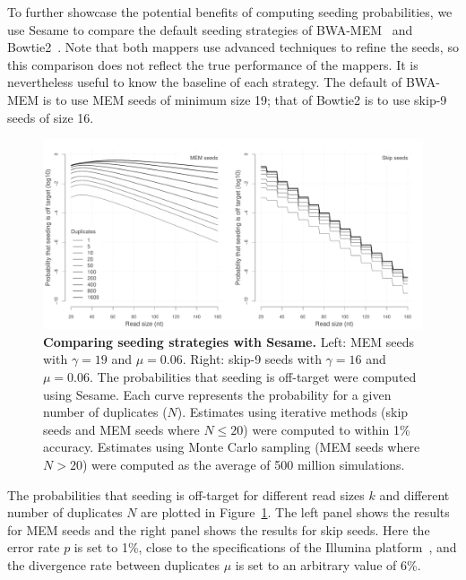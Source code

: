 \documentclass{article}
\begin{document}
To further showcase the potential benefits of computing seeding
probabilities, we use Sesame to compare the default seeding strategies of
BWA-MEM~\cite{li2013aligning} and Bowtie2~\cite{pmid22388286}. Note that
both mappers use advanced techniques to refine the seeds, so this
comparison does not reflect the true performance of the mappers. It is
nevertheless useful to know the baseline of each strategy. The default of
BWA-MEM is to use MEM seeds of minimum size 19; that of Bowtie2 is to use
skip-9 seeds of size 16.

\begin{figure}[t]
\begin{center}
\includegraphics[scale=.41]{mortal_kombat.pdf}
\end{center}
\caption{\textbf{Comparing seeding strategies with Sesame.} Left: MEM
seeds with $\gamma=19$ and $\mu=0.06$. Right: skip-9 seeds with
$\gamma=16$ and $\mu=0.06$. The probabilities that seeding is off-target
were computed using Sesame. Each curve represents the probability for a
given number of duplicates ($N$). Estimates using iterative methods (skip
seeds and MEM seeds where $N \leq 20$) were computed to within 1\%
accuracy. Estimates using Monte Carlo sampling (MEM seeds where $N > 20$)
were computed as the average of 500 million simulations.
}
\label{fig_mortal_kombat}
\end{figure}

The probabilities that seeding is off-target for different read sizes $k$
and different number of duplicates $N$ are plotted in
Figure~\ref{fig_mortal_kombat}. The left panel shows the results for MEM
seeds and the right panel shows the results for skip seeds. Here the error
rate $p$ is set to 1\%, close to the specifications of the Illumina
platform~\cite{pmid21576222}, and the divergence rate between duplicates
$\mu$ is set to an arbitrary value of 6\%.
\end{document}
